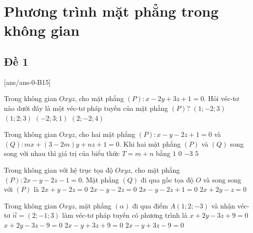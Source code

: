 \section{Phương trình mặt phẳng trong không gian}
\subsection{Đề 1}
[ans/ans-0-B15]
\caulc
\begin{ex}%
	Trong không gian $Oxyz$, cho mặt phẳng $(P)\colon x-2 y+3 z+1=0$. Hỏi véc-tơ nào dưới đây là một véc-tơ pháp tuyến của mặt phẳng $(P)$?
	\choice
	{\True $(1;-2; 3)$}
	{$(1; 2; 3)$}
	{$(-2; 3; 1)$}
	{$(2;-2; 4)$}
\end{ex}
\begin{ex}%
	Trong không gian $Oxyz$, cho hai mặt phẳng $(P)\colon x-y-2z+1=0$ và $(Q)\colon mx+(3-2m)y+nz+1=0$. Khi hai mặt phẳng $(P)$ và $(Q)$ song song với nhau thì giá trị của biểu thức $T=m+n$ bằng
	\choice
	{$1$}
	{$0$}
	{\True $-3$}
	{$5$}
\end{ex}

\begin{ex}%
	Trong không gian với hệ trục tọa độ $Oxyz$, cho mặt phẳng $(P)\colon 2x-y-2z-1=0$. Mặt phẳng $(Q)$ đi qua gốc tọa độ $O$ và song song với $(P)$ là
	\choice
	{$2x+y-2z=0$}
	{\True $2x-y-2z=0$}
	{$2x-y-2z+1=0$}
	{$2x+2y-z=0$}
\end{ex}


\begin{ex}%
	Trong không gian $Oxyz$, mặt phẳng $(\alpha)$ đi qua điểm $A(1;2;-3)$ và nhận véc-tơ $\overrightarrow{n}=(2;-1;3)$ làm véc-tơ pháp tuyến có phương trình là
	\choice
	{$x+2y-3z+9=0$}
	{$x+2y-3z-9=0$}
	{\True $2x-y+3z+9=0$}
	{$2x-y+3z-9=0$}
\end{ex}

